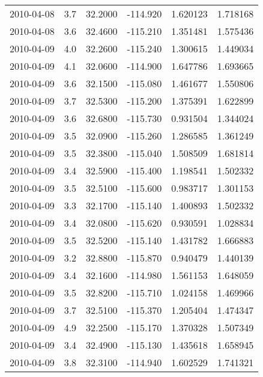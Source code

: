 \begin{tabular}{lrrrrr}
2010-04-08 &       3.7 &  32.2000 &  -114.920 &         1.620123 &         1.718168 \\
2010-04-08 &       3.6 &  32.4600 &  -115.210 &         1.351481 &         1.575436 \\
2010-04-09 &       4.0 &  32.2600 &  -115.240 &         1.300615 &         1.449034 \\
2010-04-09 &       4.1 &  32.0600 &  -114.900 &         1.647786 &         1.693665 \\
2010-04-09 &       3.6 &  32.1500 &  -115.080 &         1.461677 &         1.550806 \\
2010-04-09 &       3.7 &  32.5300 &  -115.200 &         1.375391 &         1.622899 \\
2010-04-09 &       3.6 &  32.6800 &  -115.730 &         0.931504 &         1.344024 \\
2010-04-09 &       3.5 &  32.0900 &  -115.260 &         1.286585 &         1.361249 \\
2010-04-09 &       3.5 &  32.3800 &  -115.040 &         1.508509 &         1.681814 \\
2010-04-09 &       3.4 &  32.5900 &  -115.400 &         1.198541 &         1.502332 \\
2010-04-09 &       3.5 &  32.5100 &  -115.600 &         0.983717 &         1.301153 \\
2010-04-09 &       3.3 &  32.1700 &  -115.140 &         1.400893 &         1.502332 \\
2010-04-09 &       3.4 &  32.0800 &  -115.620 &         0.930591 &         1.028834 \\
2010-04-09 &       3.5 &  32.5200 &  -115.140 &         1.431782 &         1.666883 \\
2010-04-09 &       3.2 &  32.8800 &  -115.870 &         0.940479 &         1.440139 \\
2010-04-09 &       3.4 &  32.1600 &  -114.980 &         1.561153 &         1.648059 \\
2010-04-09 &       3.5 &  32.8200 &  -115.710 &         1.024158 &         1.469966 \\
2010-04-09 &       3.7 &  32.5100 &  -115.370 &         1.205404 &         1.474347 \\
2010-04-09 &       4.9 &  32.2500 &  -115.170 &         1.370328 &         1.507349 \\
2010-04-09 &       3.4 &  32.4900 &  -115.130 &         1.435618 &         1.658945 \\
2010-04-09 &       3.8 &  32.3100 &  -114.940 &         1.602529 &         1.741321 \\

\end{tabular}
